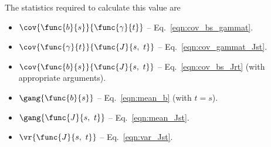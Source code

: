 The statistics required to calculate this value are

\begin{itemize}
	\item [] $\cov{\func{b}{s}}{\func{\gamma}{t}}$ -- Eq.~\ref{eqn:cov_bs_gammat}.
	\item [] $\cov{\func{\gamma}{t}}{\func{J}{s,\ t}}$ -- Eq.~\ref{eqn:cov_gammat_Jst}.
	\item [] $\cov{\func{b}{s}}{\func{J}{s,\ t}}$ -- Eq.~\ref{eqn:cov_bs_Jrt} (with appropriate arguments).
	\item [] $\gang{\func{b}{s}}$ -- Eq.~\ref{eqn:mean_b} (with $t = s$).
	\item [] $\gang{\func{J}{s,\ t}}$ -- Eq.~\ref{eqn:mean_Jst}.
	\item [] $\vr{\func{J}{s,\ t}}$ -- Eq.~\ref{eqn:var_Jst}.
\end{itemize}
